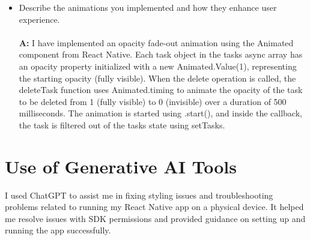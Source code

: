 \documentclass{article}
\begin{document}
\begin{enumerate}
\begin{itemize}
\begin{center}
                    \end{center}
                   \item Describe the animations you implemented and how they enhance user experience.\\
                   \\
        \textbf{A:} I have implemented an opacity fade-out animation using the Animated component from React Native. Each task object in the tasks async array has an opacity property initialized with a new Animated.Value(1), representing the starting opacity (fully visible). When the delete operation is called, the deleteTask function uses Animated.timing to animate the opacity of the task to be deleted from 1 (fully visible) to 0 (invisible) over a duration of 500 milliseconds. The animation is started using .start(), and inside the callback, the task is filtered out of the tasks state using setTasks.

                \end{itemize}
        \end{enumerate}


        \section*{Use of Generative AI Tools}
        I used ChatGPT to assist me in fixing styling issues and troubleshooting problems related to running my React Native app on a physical device. It helped me resolve issues with SDK permissions and provided guidance on setting up and running the app successfully.
\end{document}
